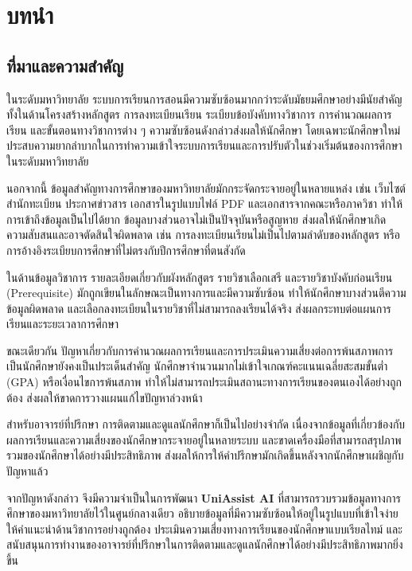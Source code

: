 \chapter{บทนำ}
\label{chapter:introduction}

\section{ที่มาและความสำคัญ}

ในระดับมหาวิทยาลัย ระบบการเรียนการสอนมีความซับซ้อนมากกว่าระดับมัธยมศึกษาอย่างมีนัยสำคัญ ทั้งในด้านโครงสร้างหลักสูตร การลงทะเบียนเรียน ระเบียบข้อบังคับทางวิชาการ การคำนวณผลการเรียน และขั้นตอนทางวิชาการต่าง ๆ ความซับซ้อนดังกล่าวส่งผลให้นักศึกษา โดยเฉพาะนักศึกษาใหม่ ประสบความยากลำบากในการทำความเข้าใจระบบการเรียนและการปรับตัวในช่วงเริ่มต้นของการศึกษาในระดับมหาวิทยาลัย

นอกจากนี้ ข้อมูลสำคัญทางการศึกษาของมหาวิทยาลัยมักกระจัดกระจายอยู่ในหลายแหล่ง เช่น เว็บไซต์สำนักทะเบียน ประกาศข่าวสาร เอกสารในรูปแบบไฟล์ PDF และเอกสารจากคณะหรือภาควิชา ทำให้การเข้าถึงข้อมูลเป็นไปได้ยาก ข้อมูลบางส่วนอาจไม่เป็นปัจจุบันหรือสูญหาย ส่งผลให้นักศึกษาเกิดความสับสนและอาจตัดสินใจผิดพลาด เช่น การลงทะเบียนเรียนไม่เป็นไปตามลำดับของหลักสูตร หรือการอ้างอิงระเบียบการศึกษาที่ไม่ตรงกับปีการศึกษาที่ตนสังกัด

ในด้านข้อมูลวิชาการ รายละเอียดเกี่ยวกับผังหลักสูตร รายวิชาเลือกเสรี และรายวิชาบังคับก่อนเรียน (Prerequisite) มักถูกเขียนในลักษณะเป็นทางการและมีความซับซ้อน ทำให้นักศึกษาบางส่วนตีความข้อมูลผิดพลาด และเลือกลงทะเบียนในรายวิชาที่ไม่สามารถลงเรียนได้จริง ส่งผลกระทบต่อแผนการเรียนและระยะเวลาการศึกษา

ขณะเดียวกัน ปัญหาเกี่ยวกับการคำนวณผลการเรียนและการประเมินความเสี่ยงต่อการพ้นสภาพการเป็นนักศึกษายังคงเป็นประเด็นสำคัญ นักศึกษาจำนวนมากไม่เข้าใจเกณฑ์คะแนนเฉลี่ยสะสมขั้นต่ำ (GPA) หรือเงื่อนไขการพ้นสภาพ ทำให้ไม่สามารถประเมินสถานะทางการเรียนของตนเองได้อย่างถูกต้อง ส่งผลให้ขาดการวางแผนแก้ไขปัญหาล่วงหน้า

สำหรับอาจารย์ที่ปรึกษา การติดตามและดูแลนักศึกษาก็เป็นไปอย่างจำกัด เนื่องจากข้อมูลที่เกี่ยวข้องกับผลการเรียนและความเสี่ยงของนักศึกษากระจายอยู่ในหลายระบบ และขาดเครื่องมือที่สามารถสรุปภาพรวมของนักศึกษาได้อย่างมีประสิทธิภาพ ส่งผลให้การให้คำปรึกษามักเกิดขึ้นหลังจากนักศึกษาเผชิญกับปัญหาแล้ว

จากปัญหาดังกล่าว จึงมีความจำเป็นในการพัฒนา \textbf{UniAssist AI} ที่สามารถรวบรวมข้อมูลทางการศึกษาของมหาวิทยาลัยไว้ในศูนย์กลางเดียว อธิบายข้อมูลที่มีความซับซ้อนให้อยู่ในรูปแบบที่เข้าใจง่าย ให้คำแนะนำด้านวิชาการอย่างถูกต้อง ประเมินความเสี่ยงทางการเรียนของนักศึกษาแบบเรียลไทม์ และสนับสนุนการทำงานของอาจารย์ที่ปรึกษาในการติดตามและดูแลนักศึกษาได้อย่างมีประสิทธิภาพมากยิ่งขึ้น

